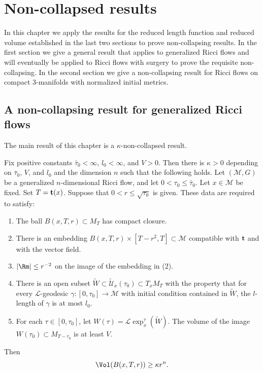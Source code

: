 \chapter{Non-collapsed results}\label{chap:noncollapsed}
\label{noncoll}

In this chapter we apply the results for the reduced length function
and reduced volume established in the last two sections to prove
non-collapsing results. In the first section we give a general
result that applies to generalized Ricci flows and will eventually
be applied to Ricci flows with surgery to prove the requisite
non-collapsing. In the second section we give a non-collapsing
result for Ricci flows on compact $3$-manifolds with normalized
initial metrics.

\section{A non-collapsing result for generalized Ricci flows}

The main result of this chapter is a
$\kappa$-non-collapsed result.

 \begin{theorem}\label{thm:kappa-noncollapsed-generalized-flow}
\label{THM}
 Fix  positive constants  $\bar\tau_0<\infty$, $l_0<\infty$, and  $V>0$.
 Then there is $\kappa>0$ depending on $\bar\tau_0$, $V$, and $l_0$
 and the dimension $n$ such
that the following holds. Let $({\mathcal M},G)$ be a generalized
$n$-dimensional Ricci flow, and let $0<\tau_0\le \bar\tau_0$. Let
$x\in {\mathcal M}$ be fixed. Set $T={\bf t}(x)$. Suppose that
$0<r\le \sqrt{\tau_0}$ is given. These data are required to satisfy:
\begin{enumerate} \item[(1)] The ball $B(x,T,r)\subset M_T$ has compact
closure. \item[(2)] There is an embedding $B(x,T,r)\times
[T-r^2,T]\subset {\mathcal M}$ compatible with ${\bf t}$ and with
the vector field. \item[(3)]  $|\Rm|\le r^{-2}$ on the image of
the embedding in (2). \item[(4)] There is an open subset $\widetilde
W\subset \widetilde {\mathcal U}_x(\tau_0)\subset T_x M_T$ with the
property that for every ${\mathcal L}$-geodesic $\gamma\colon
[0,\tau_0]\to {\mathcal M}$ with initial condition contained in
$\widetilde W$, the $l$-length of $\gamma$ is at most $l_0$.
\item[(5)] For each $\tau\in [0,\tau_0]$, let $W(\tau)={\mathcal
L}\operatorname{exp}_x^\tau(\widetilde W)$. The volume of the image
$W(\tau_0)\subset M_{T-\tau_0}$ is at least $V$.
\end{enumerate}
Then
$$\Vol(B(x,T,r))\ge \kappa r^n.$$
 \end{theorem}

